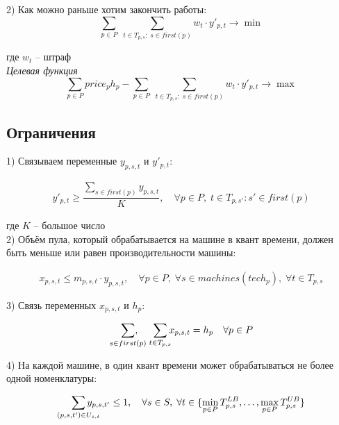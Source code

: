 \documentclass[14pt,fleqn]{extarticle}
\begin{document}
	2) Как можно раньше хотим закончить работы:	
	\[ \sum_{p \in P} \; \sum_{t \in T_{p, s}: \; s \in first(p)} w_t \cdot y'_{p,t} \longrightarrow \min \]
	
	где $w_t$ -- штраф\\
	
	\textit{Целевая функция}\\
	\[ \sum_{p \in P} price_p h_p - \sum_{p \in P} \; \sum_{t \in T_{p, s}: \; s \in first(p)} w_t \cdot y'_{p,t} \longrightarrow \max \]
	
	\subsection*{Ограничения}
	
	1) Связываем переменные $y_{p,s,t}$ и $y'_{p,t}$:
	
	\begin{ceqn}
		\begin{align*}
			y'_{p, t} \geq \dfrac{\sum_{s \in first(p)} y_{p,s,t}}{K}, \quad \forall p \in P, \; t \in T_{p,s'}: s' \in first(p)
		\end{align*}
	\end{ceqn}

	где $K$ -- большое число\\
	
	2) Объём пула, который обрабатывается на машине в квант времени, должен быть меньше или равен производительности машины:
	
	\begin{ceqn}
		\begin{align*}
			x_{p,s,t} \leq m_{p,s,t} \cdot y_{p,s,t}, \quad \forall p \in P, \; \forall s \in machines(tech_p), \; \forall t \in T_{p,s}
		\end{align*}
	\end{ceqn}
	
	3) Связь переменных $x_{p,s,t}$ и $h_p$:
	
	\begin{ceqn}
		\begin{align*}
			\smashoperator[r]{\sum_{s \in first(p)}}, \quad \smashoperator[r]{\sum_{t \in T_{p,s}}} x_{p,s,t} = h_p \quad \forall p \in P
		\end{align*}
	\end{ceqn}
	
	\newpage
	
	4) На каждой машине, в один квант времени может обрабатываться не более одной номенклатуры:
	
	\begin{ceqn}
		\begin{align*}
			\smashoperator[r]{\sum_{(p,s,t') \in U_{s,t}}} y_{p,s,t'} \leq 1, \quad \forall s \in S, \; \forall t \in \{\min_{p \in P} T_{p,s}^{LB}, \dots, \max_{p \in P} T_{p,s}^{UB}\}
		\end{align*}
	\end{ceqn}
\end{document}
